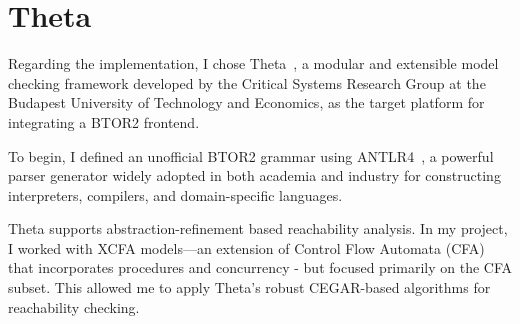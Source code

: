 
\section{Theta}

Regarding the implementation, I chose Theta~\cite{theta}, a modular and extensible model checking framework developed by the Critical Systems Research Group at the Budapest University of Technology and Economics, as the target platform for integrating a BTOR2 frontend.


To begin, I defined an unofficial BTOR2 grammar using ANTLR4~\cite{antlr}, a powerful parser generator widely adopted in both academia and industry for constructing interpreters, compilers, and domain-specific languages.

Theta supports abstraction-refinement based reachability analysis. In my project, I worked with XCFA models—an extension of Control Flow Automata (CFA) that incorporates procedures and concurrency - but focused primarily on the CFA subset. This allowed me to apply Theta's robust CEGAR-based algorithms for reachability checking.

